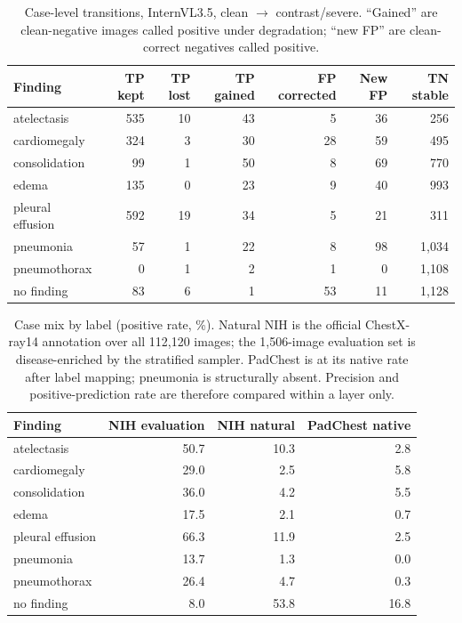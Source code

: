 \begin{table}[H]
\centering
\footnotesize
\caption{Case-level transitions, InternVL3.5, clean $\rightarrow$ contrast/severe. ``Gained'' are clean-negative images called positive under degradation; ``new FP'' are clean-correct negatives called positive.}
\label{tab:flip}
\begin{tabular}{lrrrrrr}
\toprule
Finding & TP kept & TP lost & TP gained & FP corrected & New FP & TN stable \\
\midrule
atelectasis & 535 & 10 & 43 & 5 & 36 & 256 \\
cardiomegaly & 324 & 3 & 30 & 28 & 59 & 495 \\
consolidation & 99 & 1 & 50 & 8 & 69 & 770 \\
edema & 135 & 0 & 23 & 9 & 40 & 993 \\
pleural effusion & 592 & 19 & 34 & 5 & 21 & 311 \\
pneumonia & 57 & 1 & 22 & 8 & 98 & 1,034 \\
pneumothorax & 0 & 1 & 2 & 1 & 0 & 1,108 \\
no finding & 83 & 6 & 1 & 53 & 11 & 1,128 \\
\bottomrule
\end{tabular}
\end{table}

\begin{table}[H]
\centering
\footnotesize
\caption{Case mix by label (positive rate, \%). Natural NIH is the official ChestX-ray14 annotation over all 112,120 images; the 1,506-image evaluation set is disease-enriched by the stratified sampler. PadChest is at its native rate after label mapping; pneumonia is structurally absent. Precision and positive-prediction rate are therefore compared within a layer only.}
\label{tab:prevalence}
\begin{tabular}{lrrr}
\toprule
Finding & NIH evaluation & NIH natural & PadChest native \\
\midrule
atelectasis & 50.7 & 10.3 & 2.8 \\
cardiomegaly & 29.0 & 2.5 & 5.8 \\
consolidation & 36.0 & 4.2 & 5.5 \\
edema & 17.5 & 2.1 & 0.7 \\
pleural effusion & 66.3 & 11.9 & 2.5 \\
pneumonia & 13.7 & 1.3 & 0.0 \\
pneumothorax & 26.4 & 4.7 & 0.3 \\
no finding & 8.0 & 53.8 & 16.8 \\
\bottomrule
\end{tabular}
\end{table}

